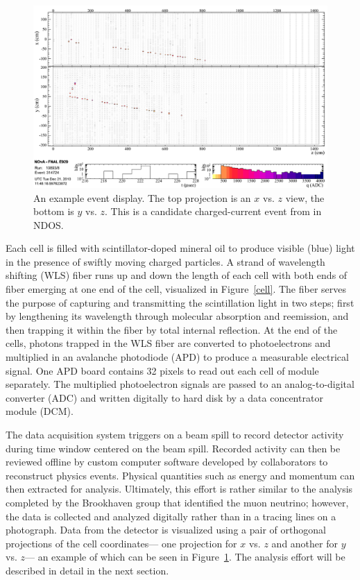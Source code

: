 \begin{figure}[t]
\begin{center}
\includegraphics[width=\textwidth]{figures/evd/evd_ndos.png}
\end{center}
\caption{An example \nova event display.  The top projection is an $x$ vs. $z$ view, the bottom is $y$ vs. $z$.  This is a candidate \numu charged-current event from in NDOS.}
\label{eventDisplay}
\end{figure} 

Each cell is filled with scintillator-doped mineral oil to produce visible (blue) light in the presence of swiftly moving charged particles.  A strand of wavelength shifting (WLS) fiber runs up and down the length of each cell with both ends of fiber emerging at one end of the cell, visualized in Figure~\ref{cell}.  The fiber serves the purpose of capturing and transmitting the scintillation light in two steps; first by lengthening its wavelength through molecular absorption and reemission, and then trapping it within the fiber by total internal reflection.  At the end of the cells, photons trapped in the WLS fiber are converted to photoelectrons and multiplied in an avalanche photodiode (APD) to produce a measurable electrical signal.  One APD board contains 32 pixels to read out each cell of module separately.  The multiplied photoelectron signals are passed to an analog-to-digital converter (ADC) and written digitally to hard disk by a data concentrator module (DCM).  

The data acquisition system triggers on a \numi beam spill to record detector activity during time window centered on the beam spill.  Recorded activity can then be reviewed offline by custom computer software developed by collaborators to reconstruct physics events.  Physical quantities such as energy and momentum can then extracted for analysis.  Ultimately, this effort is rather similar to the analysis completed by the Brookhaven group that identified the muon neutrino; however, the data is collected and analyzed digitally rather than in a tracing lines on a photograph.  Data from the detector is visualized using a pair of orthogonal projections of the cell coordinates--- one projection for $x$ vs. $z$  and another for $y$ vs. $z$--- an example of which can be seen in Figure~\ref{eventDisplay}.  The analysis effort will be described in detail in the next section.  

